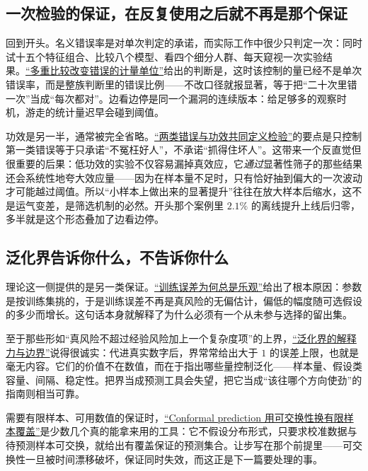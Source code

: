 \subsection{一次检验的保证，在反复使用之后就不再是那个保证}

回到开头。名义错误率是对单次判定的承诺，而实际工作中很少只判定一次：同时试十五个特征组合、比较八个模型、看四个细分人群、每天窥视一次实验结果。\hyperref[sec:11-Mathematical-Statistics/05-Hypothesis-Testing/04]{``多重比较改变错误的计量单位''}给出的判断是，这时该控制的量已经不是单次错误率，而是整族判断里的错误比例——不改口径就报显著，等于把``二十次里错一次''当成``每次都对''。边看边停是同一个漏洞的连续版本：给足够多的观察时机，游走的统计量迟早会碰到阈值。

功效是另一半，通常被完全省略。\hyperref[sec:11-Mathematical-Statistics/05-Hypothesis-Testing/01]{``两类错误与功效共同定义检验''}的要点是只控制第一类错误等于只承诺``不冤枉好人''，不承诺``抓得住坏人''。这带来一个反直觉但很重要的后果：低功效的实验不仅容易漏掉真效应，它\emph{通过}显著性筛子的那些结果还会系统性地夸大效应量——因为在样本量不足时，只有恰好抽到偏大的一次波动才可能越过阈值。所以``小样本上做出来的显著提升''往往在放大样本后缩水，这不是运气变差，是筛选机制的必然。开头那个案例里 \(2.1\%\) 的离线提升上线后归零，多半就是这个形态叠加了边看边停。

\subsection{泛化界告诉你什么，不告诉你什么}

理论这一侧提供的是另一类保证。\hyperref[sec:13-Machine-Learning/10-Learning-Theory/01]{``训练误差为何总是乐观''}给出了根本原因：参数是按训练集挑的，于是训练误差不再是真风险的无偏估计，偏低的幅度随可选假设的多少而增长。这句话本身就解释了为什么必须有一个从未参与选择的留出集。

至于那些形如``真风险不超过经验风险加上一个复杂度项''的上界，\hyperref[sec:13-Machine-Learning/10-Learning-Theory/04]{``泛化界的解释力与边界''}说得很诚实：代进真实数字后，界常常给出大于 \(1\) 的误差上限，也就是毫无内容。它们的价值不在数值，而在于指出哪些量控制泛化——样本量、假设类容量、间隔、稳定性。把界当成预测工具会失望，把它当成``该往哪个方向使劲''的指南则相当可靠。

需要有限样本、可用数值的保证时，\hyperref[sec:11-Mathematical-Statistics/07-Statistical-Decision-and-Reliable-Prediction/05]{``Conformal prediction 用可交换性换有限样本覆盖''}是少数几个真的能拿来用的工具：它不假设分布形式，只要求校准数据与待预测样本可交换，就给出有覆盖保证的预测集合。让步写在那个前提里——可交换性一旦被时间漂移破坏，保证同时失效，而这正是下一篇要处理的事。

